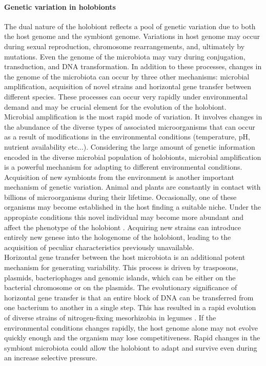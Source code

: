 \paragraph{Genetic variation in holobionts}
The dual nature of the holobiont reflects a pool of genetic variation due to both the host genome and the symbiont genome. Variations in host genome may occur during sexual reproduction, chromosome rearrangements, and, ultimately by mutations. Even the genome of the microbiota may vary during conjugation, transduction, and DNA transformation.  In addition to these processes, changes in the genome of the microbiota can occur by three other mechanisms: microbial amplification, acquisition of novel strains and horizontal gene transfer between different species. These processes can occur very rapidly under environmental demand and may be crucial element for the evolution of the holobiont.\\
Microbial amplification is the most rapid mode of variation. It involves changes in the abundance of the diverse types of associated microorganisms that can occur as a result of modifications in the environmental conditions (temperature, pH, nutrient availability etc...). Considering the large amount of genetic information encoded in the diverse microbial population of holobionts, microbial amplification is a powerful mechanism for adapting to different environmental conditions.\\
Acquisition of new symbionts from the environment is another important mechanism of genetic variation. Animal and plants are constantly in contact with billions of microorganisms during their lifetime. Occasionally, one of these organisms may become established in the host finding a suitable niche. Under the appropiate conditions this novel individual may become more abundant and affect the phenotype of the holobiont . Acquiring new strains can introduce entirely new genese into the hologenome of the holobiont, leading to the acquisition of peculiar characteristics previously unavailable.\\
Horizontal gene transfer between the host microbiota is an additional potent mechanism for generating variability. This process is driven by trasposons, plasmids, bacteriophages and genomic islands, which can be either on the bacterial chromosome or on the plasmids. The evolutionary significance of horizontal gene transfer is that an entire block of DNA can be transferred from one bacterium to another in a single step. This has resulted in a rapid evolution of diverse strains of nitrogen-fixing mesorhizobia in legumes \cite{nandasena2007situ}. If the environmental conditions changes rapidly, the host genome alone may not evolve quickly enough and the organism may lose competitiveness. Rapid changes in the symbiont microbiota could allow the holobiont to adapt and survive even during an increase selective pressure.\\

